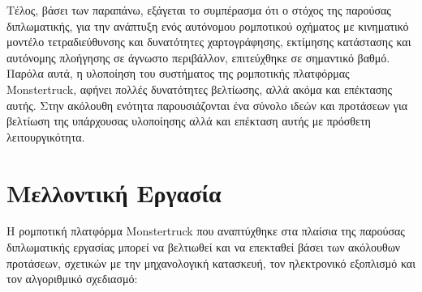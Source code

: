 \bigskip
Τέλος, βάσει των παραπάνω, εξάγεται το συμπέρασμα ότι ο στόχος της παρούσας διπλωματικής, για την ανάπτυξη ενός αυτόνομου ρομποτικού οχήματος με κινηματικό μοντέλο τετραδιεύθυνσης και δυνατότητες χαρτογράφησης, εκτίμησης κατάστασης και αυτόνομης πλοήγησης σε άγνωστο περιβάλλον, επιτεύχθηκε σε σημαντικό βαθμό. Παρόλα αυτά, η υλοποίηση του συστήματος της ρομποτικής πλατφόρμας Monstertruck, αφήνει πολλές δυνατότητες βελτίωσης, αλλά ακόμα και επέκτασης αυτής. Στην ακόλουθη ενότητα παρουσιάζονται ένα σύνολο ιδεών και προτάσεων για βελτίωση της υπάρχουσας υλοποίησης αλλά και επέκταση αυτής με πρόσθετη λειτουργικότητα.

\section{Μελλοντική Εργασία}
Η ρομποτική πλατφόρμα Monstertruck που αναπτύχθηκε στα πλαίσια της παρούσας διπλωματικής εργασίας μπορεί να βελτιωθεί και να επεκταθεί βάσει των ακόλουθων προτάσεων, σχετικών με την μηχανολογική κατασκευή, τον ηλεκτρονικό εξοπλισμό και τον αλγοριθμικό σχεδιασμό:

